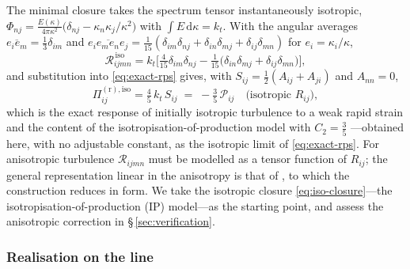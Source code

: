 \documentclass[lineno]{JFM-FLM_Au}
\begin{document}
The minimal closure takes the spectrum tensor instantaneously isotropic,
$\Phi_{nj}=\frac{E(\kappa)}{4\pi\kappa^2}
\big(\delta_{nj}-\kappa_n\kappa_j/\kappa^2\big)$ with
$\int E\,\mathrm{d}\kappa=k_t$. With the angular averages
$\overline{e_ie_m}=\tfrac13\delta_{im}$ and
$\overline{e_ie_me_ne_j}=\tfrac1{15}(\delta_{im}\delta_{nj}
+\delta_{in}\delta_{mj}+\delta_{ij}\delta_{mn})$ for
$e_i=\kappa_i/\kappa$,
\begin{equation}
  \mathcal{R}_{ijmn}^{\,\mathrm{iso}}
  = k_t\Big[\tfrac{4}{15}\delta_{im}\delta_{nj}
    -\tfrac1{15}\big(\delta_{in}\delta_{mj}
    +\delta_{ij}\delta_{mn}\big)\Big],
  \label{eq:iso-closure}
\end{equation}
and substitution into \eqref{eq:exact-rps} gives, with
$S_{ij}=\tfrac12(A_{ij}+A_{ji})$ and $A_{nn}=0$,
\begin{equation}
  \Pi^{(\mathrm r),\mathrm{iso}}_{ij}
  = \tfrac{4}{5}\,k_t\,S_{ij}
  \;=\; -\tfrac{3}{5}\,\mathcal{P}_{ij}
  \quad\text{(isotropic $R_{ij}$)},
  \label{eq:crow}
\end{equation}
which is the exact response of initially isotropic turbulence to a weak rapid
strain \citep{Crow1968} and the content of the
isotropisation-of-production model with $C_2=\tfrac35$
\citep{Pope2000}---obtained here, with no adjustable constant, as the
isotropic limit of \eqref{eq:exact-rps}. For anisotropic turbulence
$\mathcal{R}_{ijmn}$ must be modelled as a tensor function of $R_{ij}$;
the general representation linear in the anisotropy is that of
\citet{LaunderReeceRodi1975}, to which the construction reduces in form.
We take the isotropic closure \eqref{eq:iso-closure}---the
isotropisation-of-production (IP) model---as the starting point, and
assess the anisotropic correction in \S\,\ref{sec:verification}.

\subsubsection{Realisation on the line}\label{sec:line-realisation}
\end{document}
